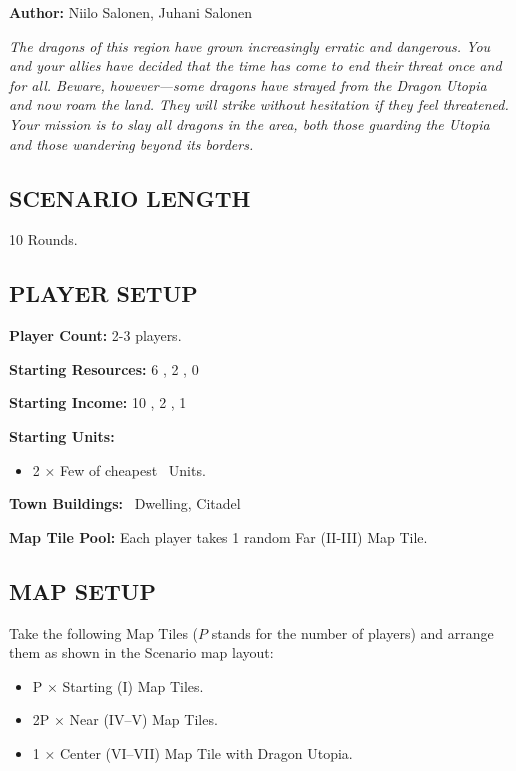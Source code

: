 
\begin{multicols}{2}

\textbf{Author:} Niilo Salonen, Juhani Salonen

\textit{The dragons of this region have grown increasingly erratic and dangerous.
You and your allies have decided that the time has come to end their threat once and for all.
Beware, however—some dragons have strayed from the Dragon Utopia and now roam the land.
They will strike without hesitation if they feel threatened.
Your mission is to slay all dragons in the area, both those guarding the Utopia and those wandering beyond its borders.}  %

\subsection*{\MakeUppercase{Scenario Length}}
10 Rounds.

\subsection*{\MakeUppercase{Player Setup}}
\textbf{Player Count:} 2-3 players.

\textbf{Starting Resources:} 6 , 2 , 0 

\textbf{Starting Income:} 10 , 2 , 1 

\textbf{Starting Units:}

\begin{itemize}
  \item 2 × Few of cheapest \bronze\ Units.
\end{itemize}

\textbf{Town Buildings:} \bronze\ Dwelling, Citadel

\textbf{Map Tile Pool:} Each player takes 1 random Far (II-III) Map Tile.

\subsection*{\MakeUppercase{Map Setup}}
Take the following Map Tiles ($P$ stands for the number of players) and arrange them as shown in the Scenario map layout:

\begin{itemize}
  \item P × Starting (I) Map Tiles.
  \item 2P × Near (IV–V) Map Tiles.
  \item 1 × Center (VI–VII) Map Tile with Dragon Utopia.
\end{itemize}


\end{multicols}
